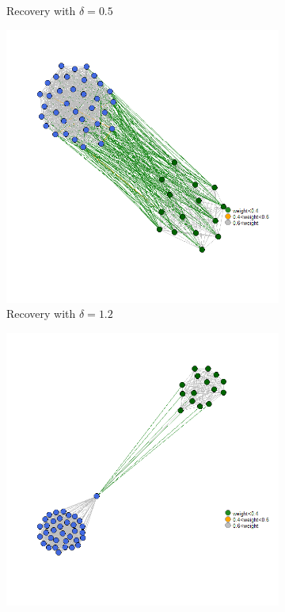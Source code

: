 \documentclass[12pt]{amsart}
\theoremstyle{remark}
\begin{document}
\begin{figure}[h]
\begin{subfigure}[b]{0.37\textwidth}
         \caption{Recovery with $\delta=0.5$}
     \end{subfigure}
     \hfill
     \begin{subfigure}[b]{0.37\textwidth}
         \centering
         \includegraphics[width=\textwidth]{./Pictures/recupera4.png}
         \caption{Recovery with $\delta=1.2$}
     \end{subfigure}
     	\hfill
     \begin{subfigure}[b]{0.37\textwidth}
         \centering
         \includegraphics[width=\textwidth]{./Pictures/recupera5.png}

\end{subfigure}
\end{figure}
\end{document}
